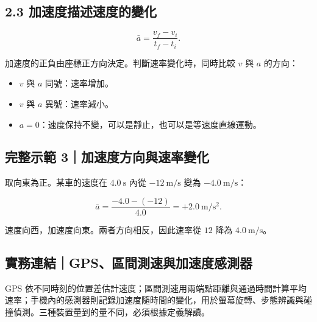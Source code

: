 \documentclass[11pt,a4paper]{article}
\providecommand{\tightlist}{%
  \setlength{\itemsep}{0pt}\setlength{\parskip}{0pt}}
\begin{document}
\subsection{2.3 加速度描述速度的變化}\label{ux52a0ux901fux5ea6ux63cfux8ff0ux901fux5ea6ux7684ux8b8aux5316}

\[
\bar a=\frac{v_f-v_i}{t_f-t_i}.
\]

加速度的正負由座標正方向決定。判斷速率變化時，同時比較 \(v\) 與 \(a\) 的方向：

\begin{itemize}
\tightlist
\item
  \(v\) 與 \(a\) 同號：速率增加。
\item
  \(v\) 與 \(a\) 異號：速率減小。
\item
  \(a=0\)：速度保持不變，可以是靜止，也可以是等速度直線運動。
\end{itemize}

\begin{HandoutWorkedExample}

\subsection{完整示範 3｜加速度方向與速率變化}\label{ux5b8cux6574ux793aux7bc4-3ux52a0ux901fux5ea6ux65b9ux5411ux8207ux901fux7387ux8b8aux5316}

取向東為正。某車的速度在 \(4.0\ \mathrm s\) 內從 \(-12\ \mathrm{m/s}\) 變為 \(-4.0\ \mathrm{m/s}\)：

\[
\bar a=\frac{-4.0-(-12)}{4.0}=+2.0\ \mathrm{m/s^2}.
\]

速度向西，加速度向東。兩者方向相反，因此速率從 \(12\) 降為 \(4.0\ \mathrm{m/s}\)。

\end{HandoutWorkedExample}

\subsection{實務連結｜GPS、區間測速與加速度感測器}\label{ux5be6ux52d9ux9023ux7d50gpsux5340ux9593ux6e2cux901fux8207ux52a0ux901fux5ea6ux611fux6e2cux5668}

GPS 依不同時刻的位置差估計速度；區間測速用兩端點距離與通過時間計算平均速率；手機內的感測器則記錄加速度隨時間的變化，用於螢幕旋轉、步態辨識與碰撞偵測。三種裝置量到的量不同，必須根據定義解讀。
\end{document}
